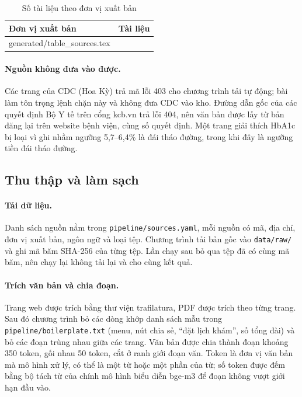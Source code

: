 \documentclass[11pt,a4paper]{article}
\makeatletter
\newcommand{\tablerows}[1]{\@@input #1 }
\makeatother
\begin{document}
\begin{table}[H]
\centering
\caption{Số tài liệu theo đơn vị xuất bản}
\begin{tabular}{lr}
\toprule
Đơn vị xuất bản & Tài liệu \\
\midrule
\tablerows{generated/table_sources.tex}
\bottomrule
\end{tabular}
\end{table}

\paragraph{Nguồn không đưa vào được.}
Các trang của CDC (Hoa Kỳ) trả mã lỗi 403 cho chương trình tải tự động; bài làm tôn trọng lệnh chặn này và không
đưa CDC vào kho. Đường dẫn gốc của các quyết định Bộ Y tế trên cổng kcb.vn trả lỗi 404, nên văn bản được lấy từ
bản đăng lại trên website bệnh viện, cùng số quyết định. Một trang giải thích HbA1c bị loại vì ghi nhầm ngưỡng
5,7--6,4\% là đái tháo đường, trong khi đây là ngưỡng tiền đái tháo đường.

\subsection{Thu thập và làm sạch}

\paragraph{Tải dữ liệu.}
Danh sách nguồn nằm trong \texttt{pipeline/sources.yaml}, mỗi nguồn có mã, địa chỉ, đơn vị xuất bản, ngôn ngữ và
loại tệp. Chương trình tải bản gốc vào \texttt{data/raw/} và ghi mã băm SHA-256 của từng tệp. Lần chạy sau
bỏ qua tệp đã có cùng mã băm, nên chạy lại không tải lại và cho cùng kết quả.

\paragraph{Trích văn bản và chia đoạn.}
Trang web được trích bằng thư viện trafilatura, PDF được trích theo từng trang. Sau đó chương trình bỏ các dòng
khớp danh sách mẫu trong \texttt{pipeline/boilerplate.txt} (menu, nút chia sẻ, “đặt lịch khám”, số tổng đài) và
bỏ các đoạn trùng nhau giữa các trang. Văn bản được chia thành đoạn khoảng 350 token, gối nhau 50 token, cắt ở
ranh giới đoạn văn. Token là đơn vị văn bản mà mô hình xử lý, có thể là một từ hoặc một phần của từ; số token
được đếm bằng bộ tách từ của chính mô hình biểu diễn bge-m3 để đoạn không vượt giới hạn đầu vào.
\end{document}
